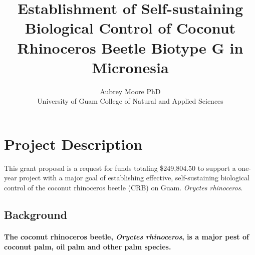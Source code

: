 \documentclass[12pt,letterpaper,english,bibliography=totocnumbered, abstract=on]{scrartcl}
\begin{document}
\titlehead{Grant Proposal: DOI-OIA Coral Reef and Natural Resources Initiative FY2020}

\title{Establishment of Self-sustaining Biological Control of Coconut Rhinoceros Beetle Biotype G in Micronesia }

\author{Aubrey Moore PhD\\University of Guam College of Natural and Applied Sciences}

\maketitle
\newpage
\tableofcontents

\pagebreak

\section{Project Description}


This grant proposal is a request for funds totaling \$249,804.50 to support a one-year project with a major goal of establishing effective, self-sustaining biological control of the coconut rhinoceros beetle (CRB) on Guam. \textit{Oryctes rhinoceros}.

\subsection{Background}

\paragraph{The coconut rhinoceros beetle, \emph{Oryctes rhinoceros}, is a major
pest of coconut palm, oil palm and other palm species.}
\end{document}
